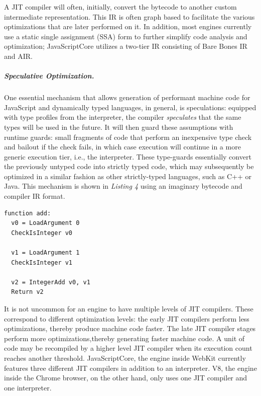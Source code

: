 \noindent
A JIT compiler will often, initially, convert the bytecode to another custom intermediate representation.
This IR is often graph based to facilitate the various optimizations that are later performed on it. In
addition, most engines currently use a static single assignment (SSA) form to further simplify code
analysis and optimization; JavaScriptCore utilizes a two-tier IR consisting of Bare Bones IR and AIR.%

\subparagraph{\textit{Speculative Optimization. }}%
One essential mechanism that allows generation of performant machine code for JavaScript
and dynamically typed languages, in general, is speculations: equipped with type profiles from the
interpreter, the compiler \textit{speculates} that the same types will be used in the future. It will
then guard these assumptions with runtime guards: small fragments of code that perform an inexpensive
type check and bailout if the check fails, in which case execution will continue in a more generic
execution tier, i.e., the interpreter. These type-guards essentially convert the previously untyped
code into strictly typed code, which may subsequently be optimized in a similar fashion as other
strictly-typed languages, such as C++ or Java. This mechanism is shown in \textit{Listing 4} using an
imaginary bytecode and compiler IR format.

\begin{lstfloat}
\begin{lstlisting}[style=JS,caption=Compiler IR for interpreter bytecode\protect\footnotemark]
function add:
  v0 = LoadArgument 0  
  CheckIsInteger v0

  v1 = LoadArgument 1  
  CheckIsInteger v1
    
  v2 = IntegerAdd v0, v1
  Return v2
\end{lstlisting}
\end{lstfloat}

\vspace{-1.5em}\noindent
It is not uncommon for an engine to have multiple levels of JIT compilers.  These correspond to
different optimization levels: the early JIT compilers perform less optimizations, thereby produce
machine code faster. The late JIT compiler stages perform more optimizations,thereby generating
faster machine code.  A unit of code may be recompiled by a higher level JIT compiler when its
execution count reaches another threshold.  JavaScriptCore, the engine inside WebKit currently
features three different JIT compilers in addition to an interpreter. V8, the engine inside the
Chrome browser, on the other hand, only uses one JIT compiler and one interpreter.%

